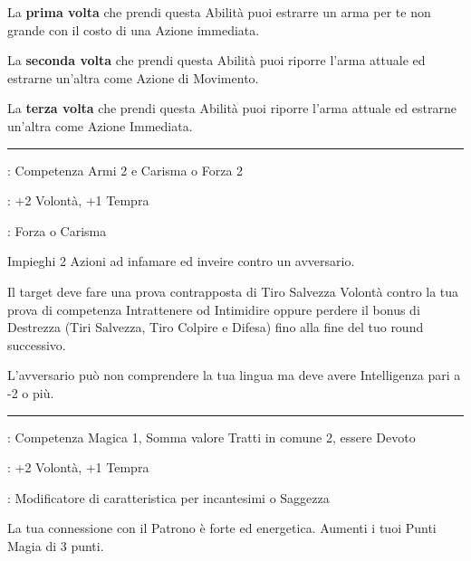\begin{multicols}{2}
La \textbf{prima volta} che prendi questa Abilità puoi estrarre un arma per te non grande con il costo di una Azione immediata.

La \textbf{seconda volta} che prendi questa Abilità puoi riporre l'arma attuale ed estrarne un'altra come Azione di Movimento.

La \textbf{terza volta} che prendi questa Abilità puoi riporre l'arma attuale ed estrarne un'altra come Azione Immediata.

\smallskip\noindent\rule{\linewidth}{2pt} \hypertarget{Fare Infuriare}{}\medskip{}
\noindent
\begin{description}[noitemsep, topsep=0pt, parsep=0pt, partopsep=0pt, leftmargin=0cm, labelwidth=2.5cm]
    \item[\textbf{Requisito}]: Competenza Armi 2 e Carisma o Forza 2
    \item[\textbf{Tiri Salvezza}]: +2 Volontà, +1 Tempra
    \item[\textbf{Caratteristica}]: Forza o Carisma
\end{description}

Impieghi 2 Azioni ad infamare ed inveire contro un avversario.

Il target deve fare una prova contrapposta di Tiro Salvezza Volontà contro la tua prova di competenza Intrattenere od Intimidire oppure perdere il bonus di Destrezza (Tiri Salvezza, Tiro Colpire e Difesa) fino alla fine del tuo round successivo.

L'avversario può non comprendere la tua lingua ma deve avere Intelligenza pari a -2 o più.

\smallskip\noindent\rule{\linewidth}{2pt} \hypertarget{Fedele}{}\medskip{}
\noindent
\begin{description}[noitemsep, topsep=0pt, parsep=0pt, partopsep=0pt, leftmargin=0cm, labelwidth=2.5cm]
    \item[\textbf{Requisito}]: Competenza Magica 1, Somma valore Tratti in comune 2, essere Devoto
    \item[\textbf{Tiri Salvezza}]: +2 Volontà, +1 Tempra
    \item[\textbf{Caratteristica}]: Modificatore di caratteristica per incantesimi o Saggezza
\end{description}

La tua connessione con il Patrono è forte ed energetica. Aumenti i tuoi Punti Magia di 3 punti.


\end{multicols}
